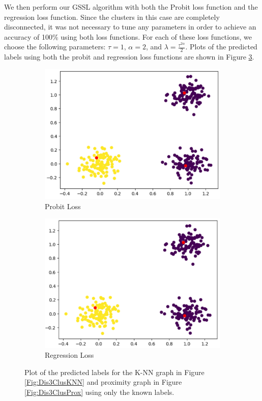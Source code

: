 \documentclass[12pt]{amsart}
\begin{document}
We then perform our GSSL algorithm with both the Probit loss function and the regression loss function. Since the clusters in this case are completely disconnected, it was not necessary to tune any parameters in order to achieve an accuracy of 100\% using both loss functions. For each of these loss functions, we choose the following parameters: $\tau=1$, $\alpha=2$, and $\lambda=\frac{\tau^{2\alpha}}{2}$. Plots of the predicted labels using both the probit and regression loss functions are shown in Figure \ref{Fig:Dis3ClusKNNRes}.

    \begin{figure}[ht] 
  \begin{subfigure}{0.475\linewidth}
    \centering
    \includegraphics[width=0.8\linewidth]{Figures/Dis3ClusKNNPro.png} 
    \caption{Probit Loss} 
    \label{Fig:Dis3ClusKNNPro} 
  \end{subfigure}%
  \begin{subfigure}{0.475\linewidth}
    \centering
    \includegraphics[width=0.8\linewidth]{Figures/Dis3ClusKNNReg.png} 
    \caption{Regression Loss} 
    \label{Fig:Dis3ClusKNNReg} 
  \end{subfigure} 
  \caption{Plot of the predicted labels for the K-NN graph in Figure \ref{Fig:Dis3ClusKNN} and proximity graph in Figure \ref{Fig:Dis3ClusProx}
  using only the known labels.}
  \label{Fig:Dis3ClusKNNRes}
\end{figure}
\end{document}
